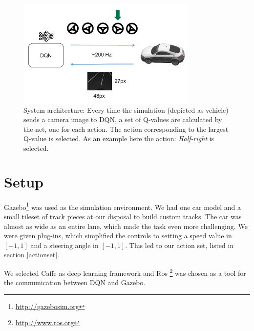 
\begin{figure}[!t]
	\centering
	\includegraphics[width=3.5in]{../presentation/archi} 
	\vspace{-2.5em}
	\caption{System architecture: Every time the simulation (depicted as vehicle) sends a camera image to DQN, a set of Q-values are calculated by the net, one for each action. The action corresponding to the largest Q-value is selected. As an example here the action: \textit{Half-right} is selected.}
	\label{fig:archi}
\end{figure}

\section{Setup} \label{sec:setup}
Gazebo\footnote{\url{http://gazebosim.org}} was used as the simulation environment. We had one car model and a small tileset of track pieces at our disposal to build custom tracks. The car was almost as wide as an entire lane, which made the task even more challenging. We were given plug-ins, which simplified the controls to setting a speed value in $[-1, 1]$ and a steering angle in $[-1, 1]$. This led to our action set, listed in section \ref{actionset}.

We selected Caffe\cite{jia2014caffe} as deep learning framework and Ros \footnote{\url{http://www.ros.org}} was chosen as a tool for the communication between DQN and Gazebo.